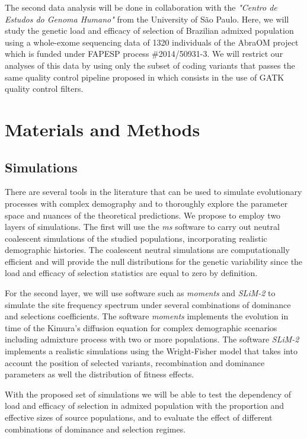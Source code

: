 \documentclass[a4paper, 12pt]{article}
\begin{document}
The second data analysis will be done in collaboration with the \textit{"Centro
  de Estudos do Genoma Humano"}  from the University of São Paulo. Here, we
will study the genetic load and efficacy of selection of Brazilian admixed
population using a whole-exome sequencing data  of 1320 individuals of the
AbraOM project \citep{Naslavsky2017} which is funded under FAPESP process
\#2014/50931-3. We will restrict our analyses of this data by using only  the
subset of coding variants that passes the same quality control pipeline
proposed in \cite{Naslavsky2017} which consists in the use of GATK quality
control filters. 


\section{Materials and Methods}

\subsection{Simulations}

There are several tools in the literature that can be used to simulate
evolutionary processes with complex demography and to thoroughly explore the
parameter space and nuances of the theoretical predictions. We propose to
employ two layers of simulations. The first  will use the \textit{ms} software
\citep{Hudson2002} to carry out neutral coalescent simulations of the studied
populations, incorporating realistic demographic histories. The coalescent
neutral simulations are computationally efficient and will provide the null
distributions for the genetic variability since the load and efficacy of
selection statistics are equal to zero by definition.

For the second layer, we will use software such as \textit{moments}
\citep{Jouganous2017} and \textit{SLiM-2} \citep{Haller2016} to simulate the
site frequency spectrum  under several combinations of dominance and selections
coefficients. The software \textit{moments} implements the evolution in time of
the Kimura's diffusion equation for complex demographic scenarios including
admixture process with two or more populations. The software \textit{SLiM-2}
implements a  realistic simulations using the Wright-Fisher model that takes
into account the position of selected variants, recombination and dominance
parameters as well the distribution of fitness effects. 

With the proposed set of simulations we will be able to test the dependency of
load and efficacy of selection in admixed population with the proportion and
effective sizes of source populations, and to evaluate the effect of different
combinations of dominance and selection regimes. 
\end{document}
